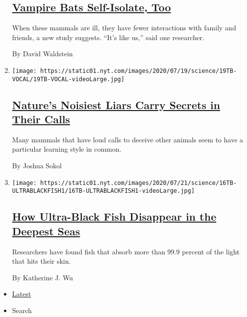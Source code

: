 \begin{enumerate}
  \hypertarget{vampire-bats-self-isolate-too}{%
  \subsection{\texorpdfstring{\href{/2020/07/22/science/vampire-bats-viruses.html}{Vampire
  Bats Self-Isolate,
  Too}}{Vampire Bats Self-Isolate, Too}}\label{vampire-bats-self-isolate-too}}

  When these mammals are ill, they have fewer interactions with family
  and friends, a new study suggests. ``It's like us,'' said one
  researcher.

  By David Waldstein
\item
  \texttt{[image: https://static01.nyt.com/images/2020/07/19/science/19TB-VOCAL/19TB-VOCAL-videoLarge.jpg]}

  \hypertarget{natures-noisiest-liars-carry-secrets-in-their-calls}{%
  \subsection{\texorpdfstring{\href{/2020/07/21/science/mammals-vocal-learning.html}{Nature's
  Noisiest Liars Carry Secrets in Their
  Calls}}{Nature's Noisiest Liars Carry Secrets in Their Calls}}\label{natures-noisiest-liars-carry-secrets-in-their-calls}}

  Many mammals that have loud calls to deceive other animals seem to
  have a particular learning style in common.

  By Joshua Sokol
\item
  \texttt{[image: https://static01.nyt.com/images/2020/07/21/science/16TB-ULTRABLACKFISH1/16TB-ULTRABLACKFISH1-videoLarge.jpg]}

  \hypertarget{how-ultra-black-fish-disappear-in-the-deepest-seas}{%
  \subsection{\texorpdfstring{\href{/2020/07/16/science/ultra-black-fish.html}{How
  Ultra-Black Fish Disappear in the Deepest
  Seas}}{How Ultra-Black Fish Disappear in the Deepest Seas}}\label{how-ultra-black-fish-disappear-in-the-deepest-seas}}

  Researchers have found fish that absorb more than 99.9 percent of the
  light that hits their skin.

  By Katherine J. Wu
\end{enumerate}

\begin{itemize}
\tightlist
\item
  \protect\hyperlink{stream-panel}{Latest}
\item
  Search
\end{itemize}

